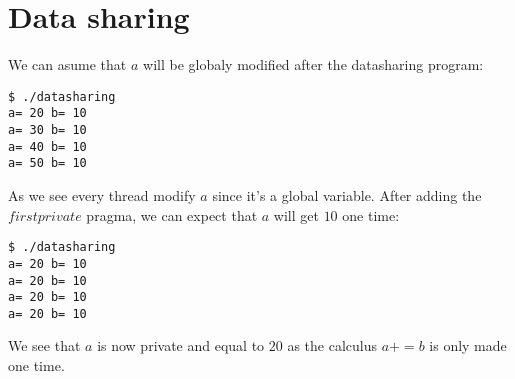 \chapter{Data sharing}

We can asume that $a$ will be globaly modified after the datasharing program:
\begin{verbatim}
$ ./datasharing 
a= 20 b= 10
a= 30 b= 10
a= 40 b= 10
a= 50 b= 10
\end{verbatim}

As we see every thread modify $a$ since it's a global variable.
After adding the $firstprivate$ pragma, we can expect that $a$ will get $10$ one time:

\begin{verbatim}
$ ./datasharing 
a= 20 b= 10
a= 20 b= 10
a= 20 b= 10
a= 20 b= 10
\end{verbatim}

We see that $a$ is now private and equal to $20$ as the calculus $a += b$ is only made one time.
